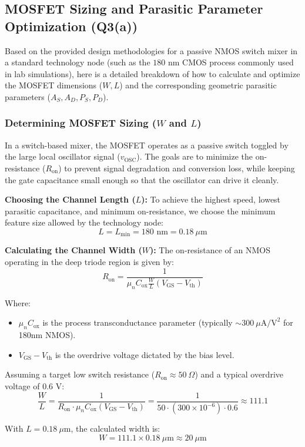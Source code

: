 \documentclass[conference]{IEEEtran}
\begin{document}
\subsection{MOSFET Sizing and Parasitic Parameter Optimization (Q3(a))}
Based on the provided design methodologies for a passive NMOS switch mixer in a standard technology node (such as the $180\text{ nm}$ CMOS process commonly used in lab simulations), here is a detailed breakdown of how to calculate and optimize the MOSFET dimensions ($W, L$) and the corresponding geometric parasitic parameters ($A_S, A_D, P_S, P_D$).

\subsubsection{Determining MOSFET Sizing ($W$ and $L$)}
In a switch-based mixer, the MOSFET operates as a passive switch toggled by the large local oscillator signal ($v_{\text{OSC}}$). The goals are to minimize the on-resistance ($R_{\text{on}}$) to prevent signal degradation and conversion loss, while keeping the gate capacitance small enough so that the oscillator can drive it cleanly.

\textbf{Choosing the Channel Length ($L$):} To achieve the highest speed, lowest parasitic capacitance, and minimum on-resistance, we choose the minimum feature size allowed by the technology node:
$$L = L_{\text{min}} = 180\text{ nm} = 0.18\ \mu\text{m}$$

\textbf{Calculating the Channel Width ($W$):} The on-resistance of an NMOS operating in the deep triode region is given by:
$$R_{\text{on}} = \frac{1}{\mu_n C_{\text{ox}} \frac{W}{L} (V_{\text{GS}} - V_{\text{th}})}$$

Where:
\begin{itemize}
    \item $\mu_n C_{\text{ox}}$ is the process transconductance parameter (typically $\sim 300\ \mu\text{A/V}^2$ for 180nm NMOS).
    \item $V_{\text{GS}} - V_{\text{th}}$ is the overdrive voltage dictated by the bias level.
\end{itemize}

Assuming a target low switch resistance ($R_{\text{on}} \approx 50\ \Omega$) and a typical overdrive voltage of $0.6\text{ V}$:
$$\frac{W}{L} = \frac{1}{R_{\text{on}} \cdot \mu_n C_{\text{ox}} (V_{\text{GS}} - V_{\text{th}})} = \frac{1}{50 \cdot (300 \times 10^{-6}) \cdot 0.6} \approx 111.1$$

With $L = 0.18\ \mu\text{m}$, the calculated width is:
$$W = 111.1 \times 0.18\ \mu\text{m} \approx 20\ \mu\text{m}$$
\end{document}
